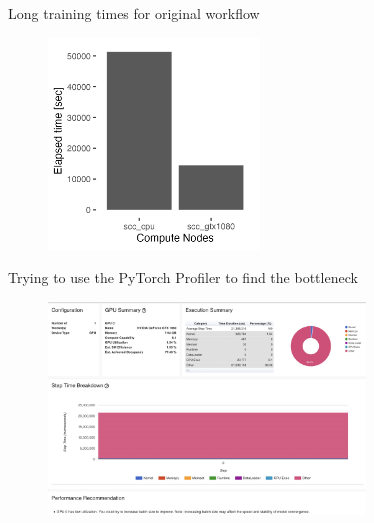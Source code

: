 \documentclass[compress,aspectratio=169]{beamer}
\begin{document}
\begin{frame}{Long training times for original workflow}
    \begin{center}
    \begin{figure}
        \includegraphics[width=0.5\textwidth]{../../data/sacct_barplot_by_nodes_profiler-torch_sample-points}
    \end{figure}
    \end{center}
\end{frame}

\begin{frame}{Trying to use the PyTorch Profiler to find the bottleneck}
	\vspace{-1em}
    \begin{center}
    \begin{figure}
        \includegraphics[width=0.75\textwidth]{../../data/scap_gtx1080_profiler-torch_sample-points_14650750}
    \end{figure}
    \end{center}
\end{frame}
\end{document}
